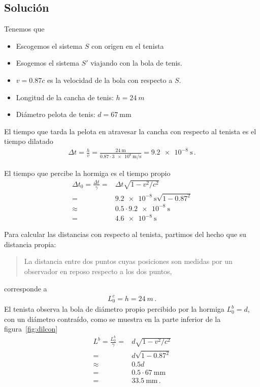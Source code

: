 \documentclass[11pt,a4paper]{article}
\begin{document}
\begin{enumerate}
\subsection*{Solución}
Tenemos que
\begin{itemize}
\item Escogemos el sistema $S$ con origen en el tenista
\item  Esogemos el sistema $S'$ viajando con la bola de tenis.
\item $v = 0.87c$ es la velocidad de la bola con respecto a $S$.
\item Longitud de la cancha de tenis: $h = \qty{24}{m}$ 
\item Diámetro pelota de tenis:  $d = \qty{67}{\milli\m}$
\end{itemize}

El tiempo que tarda la pelota en atravesar la cancha con respecto al tenista es el tiempo dilatado
\begin{align}
    \Delta t = \frac{h}{v} = \frac{\qty{24}{\m}}{0.87\cdot \qty{3e8}{\m/\s}} = \qty{9.2e-8}{\s}\,.
\end{align}

El tiempo que percibe la hormiga es el tiempo propio
\begin{align}
    \Delta t_0 = \frac{\Delta t}{\gamma} =& \Delta t \sqrt{1-v^2/c^2} \nonumber\\
    =& \qty{9.2e-8}{\s} \sqrt{1-0.87^2} \nonumber\\
 \approx &0.5\cdot \qty{9.2e-8}{\s} \nonumber\\
    =& \qty{4.6e-8}{\s}
\end{align}

Para calcular las distancias con respecto al tenista, partimos del hecho que su distancia propia:
\begin{quote}
    La distancia entre dos puntos cuyas posiciones son medidas por
un observador en reposo respecto a los dos puntos,
\end{quote}
corresponde a 
\begin{align*}
    L_0^{c} = h = \qty{24}{m}\,.
\end{align*}
El tenista observa la bola de diámetro propio percibido por la hormiga $L^b_0 = d$, con un diámetro contraído, como se muestra en la parte inferior de la figura~\ref{fig:dilcon}
\begin{align*}
    L^b = \frac{L^b_0}{\gamma} =& d \sqrt{1-v^2/c^2} \\
        =& d\sqrt{1-0.87^2}\\
        \approx& 0.5d\\
    =& 0.5\cdot \qty{67}{\milli\m}\\
    =& \qty{33.5}{\milli\m}\,.
\end{align*}


\end{enumerate}
\end{document}
